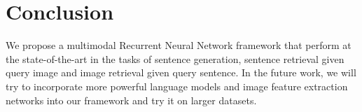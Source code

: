 
\section{Conclusion}

We propose a multimodal Recurrent Neural Network framework that perform at the state-of-the-art in the tasks of sentence generation, sentence retrieval given query image and image retrieval given query sentence.
In the future work, we will try to incorporate more powerful language models and image feature extraction networks into our framework and try it on larger datasets.